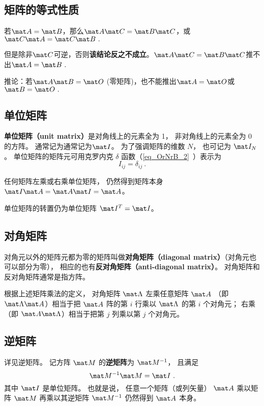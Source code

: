\subsection{矩阵的等式性质}
若$\mat A=\mat B$，那么$\mat A \mat C = \mat B \mat C$，或$\mat C \mat A = \mat C \mat B~.$

但是除非$\mat C$可逆，否则\textbf{该结论反之不成立}。$\mat A \mat C = \mat B \mat C$推不出$\mat A = \mat B~.$

推论：若$\mat A \mat B= \mat O$ (零矩阵)，也不能推出$\mat A = \mat O$或$\mat B = \mat O~.$

\subsection{单位矩阵}
\textbf{单位矩阵（unit matrix）}是对角线上的元素全为 1， 非对角线上的元素全为 0 的方阵。 通常记为通常记为$\mat I$。 为了强调矩阵的维数 $N$， 也可记为 $\mat I_N$。 单位矩阵的矩阵元可用克罗内克 $\delta$ 函数（\autoref{eq_OrNrB_2}~）表示为
\begin{equation}
I_{ij} = \delta_{ij}~.
\end{equation} 

任何矩阵左乘或右乘单位矩阵， 仍然得到矩阵本身$\mat I \mat A = \mat A \mat I = \mat A$。 

单位矩阵的转置仍为单位矩阵 $\mat I^T = \mat I$。

\subsection{对角矩阵}
对角元以外的矩阵元都为零的矩阵叫做\textbf{对角矩阵（diagonal matrix）}（对角元也可以部分为零）， 相应的也有\textbf{反对角矩阵（anti-diagonal matrix）}。 对角矩阵和反对角矩阵通常是指方阵。

根据上述矩阵乘法的定义， 对角矩阵 $\mat\Lambda$ 左乘任意矩阵 $\mat A$ （即 $\mat\Lambda\mat A$）相当于把 $\mat A$ 阵的第 $i$ 行乘以 $\mat\Lambda$ 的第 $i$ 个对角元； 右乘（即 $\mat A\mat\Lambda$）相当于把第 $j$ 列乘以第 $j$ 个对角元。

\subsection{逆矩阵}
详见逆矩阵。 记方阵 $\mat M$ 的\textbf{逆矩阵}为 $\mat M^{-1}$， 且满足
\begin{equation}
\mat M^{-1} \mat M = \mat I~.
\end{equation}
其中 $\mat I$ 是单位矩阵。 也就是说， 任意一个矩阵（或列矢量） $\mat A$ 乘以矩阵 $\mat M$ 再乘以其逆矩阵 $\mat M^{-1}$ 仍然得到 $\mat A$ 本身。

